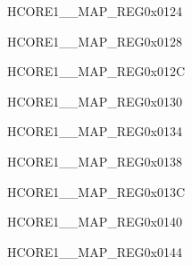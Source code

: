 \begin{register}{H}{CORE1\_\_MAP\_REG}{0x0124}\label{regdesc:CORE1KMINTMAPREG}
\end{register}\vspace{-3em}


\begin{register}{H}{CORE1\_\_MAP\_REG}{0x0128}\label{regdesc:CORE1GPIOINT0MAPREG}
\end{register}\vspace{-3em}


\begin{register}{H}{CORE1\_\_MAP\_REG}{0x012C}\label{regdesc:CORE1GPIOINT1MAPREG}
\end{register}\vspace{-3em}


\begin{register}{H}{CORE1\_\_MAP\_REG}{0x0130}\label{regdesc:CORE1GPIOINT2MAPREG}
\end{register}\vspace{-3em}


\begin{register}{H}{CORE1\_\_MAP\_REG}{0x0134}\label{regdesc:CORE1GPIOINT3MAPREG}
\end{register}\vspace{-3em}


\begin{register}{H}{CORE1\_\_MAP\_REG}{0x0138}\label{regdesc:CORE1GPIOPADCOMPINTMAPREG}
\end{register}\vspace{-3em}


\begin{register}{H}{CORE1\_\_MAP\_REG}{0x013C}\label{regdesc:CORE1CPUINTFROMCPU0MAPREG}
\end{register}\vspace{-3em}


\begin{register}{H}{CORE1\_\_MAP\_REG}{0x0140}\label{regdesc:CORE1CPUINTFROMCPU1MAPREG}
\end{register}\vspace{-3em}


\begin{register}{H}{CORE1\_\_MAP\_REG}{0x0144}\label{regdesc:CORE1CPUINTFROMCPU2MAPREG}
\end{register}\vspace{-3em}



